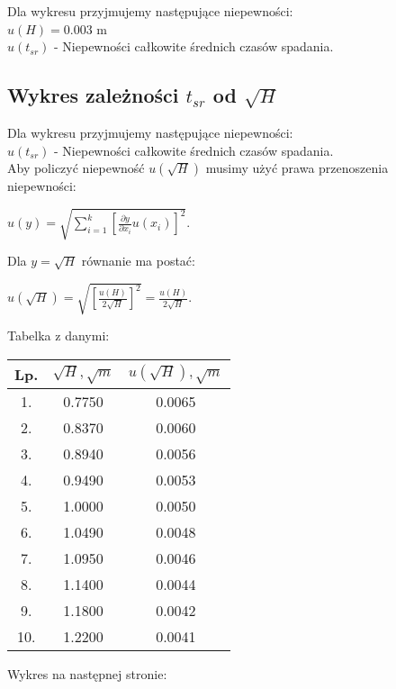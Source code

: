 \documentclass[12pt]{article}
\begin{document}
Dla wykresu przyjmujemy następujące niepewności: \\
$u(H) = 0.003$ m \\
$u(t_{sr})$ - Niepewności całkowite średnich czasów spadania.


\subsection*{Wykres zależności $t_{sr}$ od $\sqrt{H}$}

Dla wykresu przyjmujemy następujące niepewności: \\
$u(t_{sr})$ - Niepewności całkowite średnich czasów spadania. \\
Aby policzyć niepewność $u(\sqrt{H})$ musimy użyć prawa przenoszenia
niepewności:
\begin{center}
    $u(y)=\sqrt{\sum_{i=1}^{k}[\frac{\partial y}{\partial x_i}u(x_i)]^2}$.
\end{center}
Dla $y = \sqrt{H}$ równanie ma postać:
\begin{center}
    $u(\sqrt{H}) = \sqrt{[\frac{u(H)}{2\sqrt{H}}]^2} = \frac{u(H)}{2\sqrt{H}}$.
\end{center}
Tabelka z danymi:
\begin{center}
    \begin{tabular} { | c | c | c | }
        \hline
        Lp. & $\sqrt{H}, \sqrt{m}$ & $u(\sqrt{H}), \sqrt{m}$ \\
        \hline
        1.  & 0.7750               & 0.0065                  \\ \hline
        2.  & 0.8370               & 0.0060                  \\ \hline
        3.  & 0.8940               & 0.0056                  \\ \hline
        4.  & 0.9490               & 0.0053                  \\ \hline
        5.  & 1.0000               & 0.0050                  \\ \hline
        6.  & 1.0490               & 0.0048                  \\ \hline
        7.  & 1.0950               & 0.0046                  \\ \hline
        8.  & 1.1400               & 0.0044                  \\ \hline
        9.  & 1.1800               & 0.0042                  \\ \hline
        10. & 1.2200               & 0.0041                  \\ \hline
    \end{tabular}
\end{center}
Wykres na następnej stronie:
\end{document}
